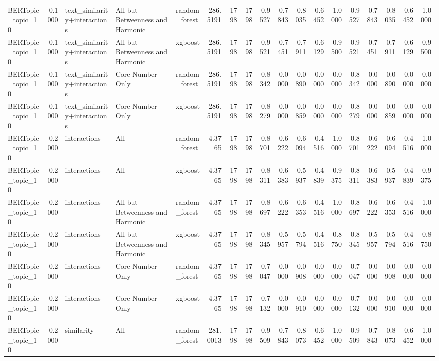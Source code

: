 \begin{tabular}{lrlllrrrrrrrrrrrrr}
BERTopic_topic_10 & 0.1000 & text_similarity+interactions & All but Betweenness and Harmonic & random_forest & 286.5191 & 1798 & 1798 & 0.9527 & 0.7843 & 0.8035 & 0.6452 & 1.0000 & 0.9527 & 0.7843 & 0.8035 & 0.6452 & 1.0000 \\
BERTopic_topic_10 & 0.1000 & text_similarity+interactions & All but Betweenness and Harmonic & xgboost & 286.5191 & 1798 & 1798 & 0.9521 & 0.7451 & 0.7911 & 0.6129 & 0.9500 & 0.9521 & 0.7451 & 0.7911 & 0.6129 & 0.9500 \\
BERTopic_topic_10 & 0.1000 & text_similarity+interactions & Core Number Only & random_forest & 286.5191 & 1798 & 1798 & 0.8342 & 0.0000 & 0.0890 & 0.0000 & 0.0000 & 0.8342 & 0.0000 & 0.0890 & 0.0000 & 0.0000 \\
BERTopic_topic_10 & 0.1000 & text_similarity+interactions & Core Number Only & xgboost & 286.5191 & 1798 & 1798 & 0.8279 & 0.0000 & 0.0859 & 0.0000 & 0.0000 & 0.8279 & 0.0000 & 0.0859 & 0.0000 & 0.0000 \\
BERTopic_topic_10 & 0.2000 & interactions & All & random_forest & 4.3765 & 1798 & 1798 & 0.8701 & 0.6222 & 0.6094 & 0.4516 & 1.0000 & 0.8701 & 0.6222 & 0.6094 & 0.4516 & 1.0000 \\
BERTopic_topic_10 & 0.2000 & interactions & All & xgboost & 4.3765 & 1798 & 1798 & 0.8311 & 0.6383 & 0.5937 & 0.4839 & 0.9375 & 0.8311 & 0.6383 & 0.5937 & 0.4839 & 0.9375 \\
BERTopic_topic_10 & 0.2000 & interactions & All but Betweenness and Harmonic & random_forest & 4.3765 & 1798 & 1798 & 0.8697 & 0.6222 & 0.6353 & 0.4516 & 1.0000 & 0.8697 & 0.6222 & 0.6353 & 0.4516 & 1.0000 \\
BERTopic_topic_10 & 0.2000 & interactions & All but Betweenness and Harmonic & xgboost & 4.3765 & 1798 & 1798 & 0.8345 & 0.5957 & 0.5794 & 0.4516 & 0.8750 & 0.8345 & 0.5957 & 0.5794 & 0.4516 & 0.8750 \\
BERTopic_topic_10 & 0.2000 & interactions & Core Number Only & random_forest & 4.3765 & 1798 & 1798 & 0.7047 & 0.0000 & 0.0908 & 0.0000 & 0.0000 & 0.7047 & 0.0000 & 0.0908 & 0.0000 & 0.0000 \\
BERTopic_topic_10 & 0.2000 & interactions & Core Number Only & xgboost & 4.3765 & 1798 & 1798 & 0.7132 & 0.0000 & 0.0910 & 0.0000 & 0.0000 & 0.7132 & 0.0000 & 0.0910 & 0.0000 & 0.0000 \\
BERTopic_topic_10 & 0.2000 & similarity & All & random_forest & 281.0013 & 1798 & 1798 & 0.9509 & 0.7843 & 0.8073 & 0.6452 & 1.0000 & 0.9509 & 0.7843 & 0.8073 & 0.6452 & 1.0000 \\

\end{tabular}
